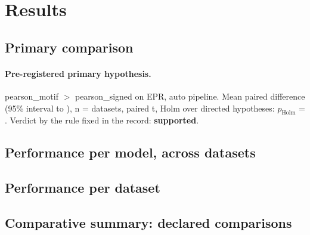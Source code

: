 \documentclass{article}
\begin{document}
\section{Results}
\subsection{Primary comparison}
\paragraph{Pre-registered primary hypothesis.} pearson\_motif $>$ pearson\_signed on EPR, auto pipeline. Mean paired difference \gbDiffEprAutoPearsonMotifVsPearsonSigned{} (95\% interval \gbCiLowEprAutoPearsonMotifVsPearsonSigned{} to \gbCiHighEprAutoPearsonMotifVsPearsonSigned{}), n = \gbNEprAutoPearsonMotifVsPearsonSigned{} datasets, paired t, Holm over \gbFamilyEprAuto{} directed hypotheses: $p_{\mathrm{Holm}}$ = \gbPHolmEprAutoPearsonMotifVsPearsonSigned{}. Verdict by the rule fixed in the record: \textbf{supported}.

\subsection{Performance per model, across datasets}

\subsection{Performance per dataset}

\subsection{Comparative summary: declared comparisons}




\end{document}
